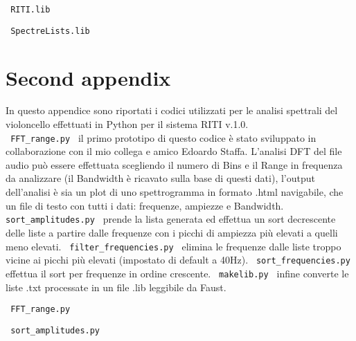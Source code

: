 \begin{center} \Large \verb| RITI.lib | \normalsize \\
    \vspace{0.2cm} \end{center}

\clearpage

\begin{center} \Large \verb| SpectreLists.lib | \normalsize \\
    \vspace{0.2cm} \end{center}

\clearpage

\section{Second appendix}

In questo appendice sono riportati i codici utilizzati per le analisi 
spettrali del violoncello effettuati in Python per il sistema RITI v.1.0. \\
\verb| FFT_range.py | il primo prototipo di questo codice è stato sviluppato
in collaborazione con il mio collega e amico Edoardo Staffa. 
L'analisi DFT del file audio può essere effettuata scegliendo il numero di Bins e 
il Range in frequenza da analizzare (il Bandwidth è ricavato sulla base di questi dati),
l'output dell'analisi è sia un plot di uno spettrogramma in formato .html navigabile,
che un file di testo con tutti i dati: frequenze, ampiezze e Bandwidth.
\verb| sort_amplitudes.py | prende la lista generata ed effettua un sort
decrescente delle liste a partire dalle frequenze con i picchi di ampiezza più 
elevati a quelli meno elevati. \verb| filter_frequencies.py | elimina le frequenze 
dalle liste troppo vicine ai picchi più elevati (impostato di default a 40Hz).
\verb| sort_frequencies.py | effettua il sort per frequenze in ordine crescente.
\verb| makelib.py | infine converte le liste .txt processate in un file .lib leggibile da Faust.
\clearpage


\begin{center} \Large \verb| FFT_range.py | \normalsize \\
    \vspace{0.2cm} \end{center}

\clearpage

\begin{center} \Large \verb| sort_amplitudes.py | \normalsize \\
    \vspace{0.2cm} \end{center}

\clearpage


